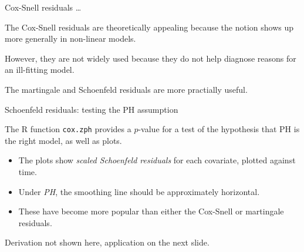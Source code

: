 \documentclass[ignorenonframetext,]{beamer}
\begin{document}
\begin{frame}{%
\protect\hypertarget{cox-snell-residuals}{%
Cox-Snell residuals \ldots}}

The Cox-Snell residuals are theoretically appealing because the notion
shows up more generally in non-linear models.

However, they are not widely used because they do not help diagnose
reasons for an ill-fitting model.

The martingale and Schoenfeld residuals are more practially useful.

\end{frame}

\begin{frame}{%
\protect\hypertarget{schoenfeld-residuals-testing-the-ph-assumption}{%
Schoenfeld residuals: testing the PH assumption}}

The \textsf{R} function \texttt{cox.zph} provides a \(p\)-value for a
test of the hypothesis that PH is the right model, as well as plots.

\begin{itemize}
\item
  The plots show \emph{scaled Schoenfeld residuals} for each covariate,
  plotted against time.
\item
  Under \emph{PH}, the smoothing line should be approximately
  horizontal.
\item
  These have become more popular than either the Cox-Snell or martingale
  residuals.
\end{itemize}

Derivation not shown here, application on the next slide.

\end{frame}
\end{document}
